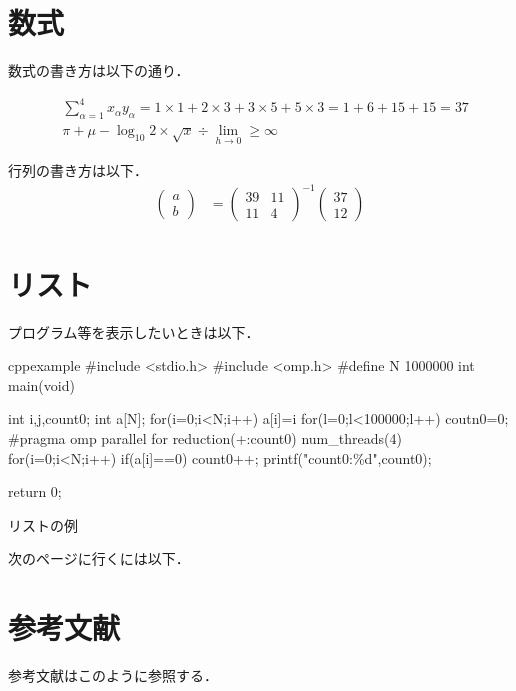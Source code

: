 \documentclass[12pt,a4paper,dvipdfmx]{jsarticle}
\begin{document}
\section{数式}
数式の書き方は以下の通り．

\begin{align*}
    &\sum_{\alpha=1}^{4} x_\alpha y_\alpha = 1\times1 + 2\times3 + 3\times5 + 5\times3 = 1+6+15+15 = 37 \\
    &\pi + \mu - \log_{10} 2 \times \sqrt{x} \div \lim_{h \to 0} \geq \infty
\end{align*}

行列の書き方は以下．
\begin{align*}
        \left(
        \begin{array}{cc}
            a \\
            b
        \end{array}
        \right)
    &=
        \left(
        \begin{array}{cc}
            39 & 11 \\
            11 & 4
        \end{array}
        \right)^{-1}
        \left(
        \begin{array}{cc}
            37 \\
            12
        \end{array}
        \right)
\end{align*}


\section{リスト}
プログラム等を表示したいときは以下．

\begin{longlisting}
\begin{myminted}{cpp}{example}
#include <stdio.h>
#include <omp.h>
#define N 1000000
int main(void){
    int i,j,count0;
    int a[N];
    for(i=0;i<N;i++) a[i]=i%
    for(l=0;l<100000;l++){
        coutn0=0;
        #pragma omp parallel for reduction(+:count0) num\_threads(4)
        for(i=0;i<N;i++){
            if(a[i]==0) count0++;
        }
    }
    printf("count0:\%d\n",count0);

    return 0;
}
\end{myminted}
\caption{リストの例}
\label{lst:}
\end{longlisting}

次のページに行くには以下．
\newpage

\section{参考文献}
参考文献はこのように参照する．\cite{bib}
\end{document}
